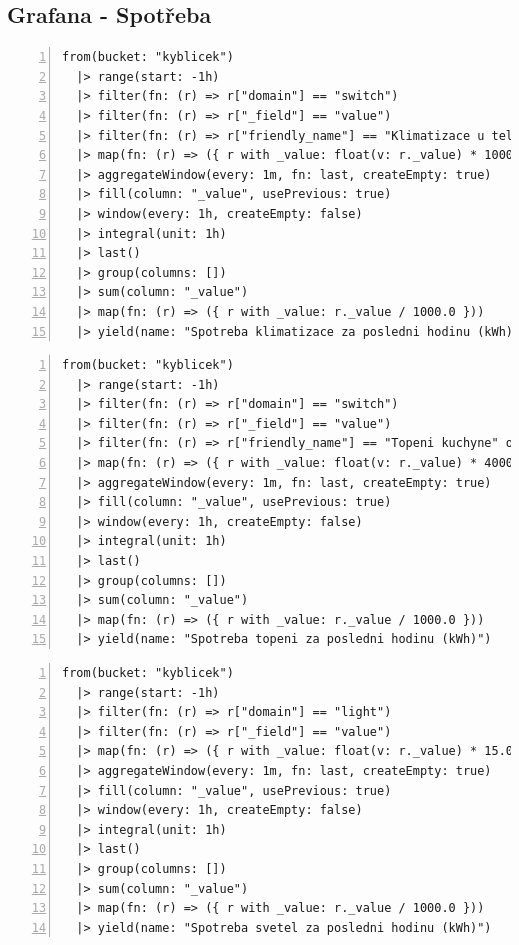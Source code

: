 \subsection{Grafana - Spotřeba}
\begin{lstlisting}[language=flux, breaklines=true, numbers=left, numberstyle=\small, numbersep=10pt, frame=single, basicstyle=\ttfamily\small, caption={Grafana - Spotřeba klimatizace}, label={lst:grafanaKlimatizaceEnergie}]
from(bucket: "kyblicek")
  |> range(start: -1h)
  |> filter(fn: (r) => r["domain"] == "switch")
  |> filter(fn: (r) => r["_field"] == "value")
  |> filter(fn: (r) => r["friendly_name"] == "Klimatizace u televize" or r["friendly_name"] == "Leva zaluzie" or r["friendly_name"] == "Prava zaluzie")
  |> map(fn: (r) => ({ r with _value: float(v: r._value) * 1000.0 }))
  |> aggregateWindow(every: 1m, fn: last, createEmpty: true)
  |> fill(column: "_value", usePrevious: true)
  |> window(every: 1h, createEmpty: false)
  |> integral(unit: 1h)
  |> last()
  |> group(columns: [])
  |> sum(column: "_value")
  |> map(fn: (r) => ({ r with _value: r._value / 1000.0 }))
  |> yield(name: "Spotreba klimatizace za posledni hodinu (kWh)")
\end{lstlisting} 
\begin{lstlisting}[language=flux, breaklines=true, numbers=left, numberstyle=\small, numbersep=10pt, frame=single, basicstyle=\ttfamily\small, caption={Grafana - Spotřeba topení}, label={lst:grafanaTopeniEnergie}]
from(bucket: "kyblicek")
  |> range(start: -1h)
  |> filter(fn: (r) => r["domain"] == "switch")
  |> filter(fn: (r) => r["_field"] == "value")
  |> filter(fn: (r) => r["friendly_name"] == "Topeni kuchyne" or r["friendly_name"] == "Topeni pracovna" or r["friendly_name"] == "Topeni u televize")
  |> map(fn: (r) => ({ r with _value: float(v: r._value) * 4000.0 }))
  |> aggregateWindow(every: 1m, fn: last, createEmpty: true)
  |> fill(column: "_value", usePrevious: true)
  |> window(every: 1h, createEmpty: false)
  |> integral(unit: 1h)
  |> last()
  |> group(columns: [])
  |> sum(column: "_value")
  |> map(fn: (r) => ({ r with _value: r._value / 1000.0 }))
  |> yield(name: "Spotreba topeni za posledni hodinu (kWh)")
\end{lstlisting}
\pagebreak
\begin{lstlisting}[language=flux, breaklines=true, numbers=left, numberstyle=\small, numbersep=10pt, frame=single, basicstyle=\ttfamily\small, caption={Grafana - Spotřeba světla}, label={lst:grafanaSvetloEnergie}]
from(bucket: "kyblicek")
  |> range(start: -1h)
  |> filter(fn: (r) => r["domain"] == "light")
  |> filter(fn: (r) => r["_field"] == "value")
  |> map(fn: (r) => ({ r with _value: float(v: r._value) * 15.0 }))
  |> aggregateWindow(every: 1m, fn: last, createEmpty: true)
  |> fill(column: "_value", usePrevious: true)
  |> window(every: 1h, createEmpty: false)
  |> integral(unit: 1h)
  |> last()
  |> group(columns: [])
  |> sum(column: "_value")
  |> map(fn: (r) => ({ r with _value: r._value / 1000.0 }))
  |> yield(name: "Spotreba svetel za posledni hodinu (kWh)")
\end{lstlisting}
